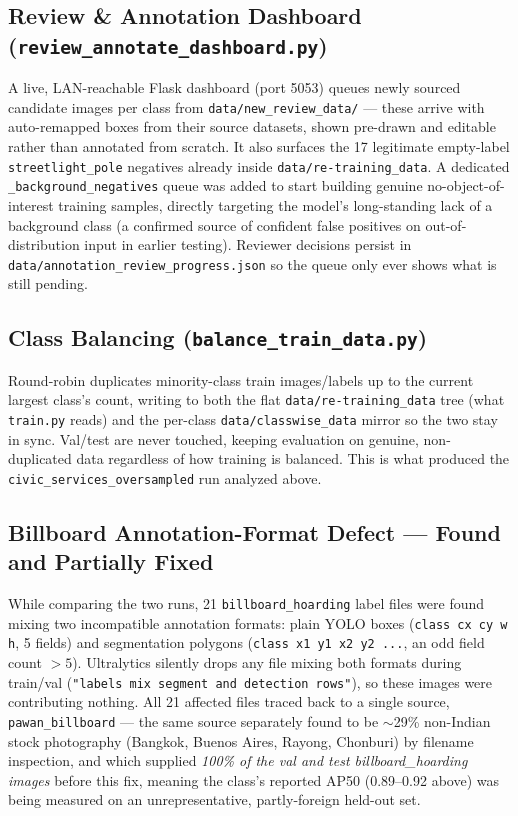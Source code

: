 \documentclass[11pt]{article}
\begin{document}
\subsection{Review \& Annotation Dashboard (\texttt{review\_annotate\_dashboard.py})}
A live, LAN-reachable Flask dashboard (port 5053) queues newly sourced candidate images
per class from \texttt{data/new\_review\_data/} — these arrive with auto-remapped boxes
from their source datasets, shown pre-drawn and editable rather than annotated from
scratch. It also surfaces the 17 legitimate empty-label \texttt{streetlight\_pole}
negatives already inside \texttt{data/re-training\_data}. A dedicated
\texttt{\_background\_negatives} queue was added to start building genuine
no-object-of-interest training samples, directly targeting the model's long-standing
lack of a background class (a confirmed source of confident false positives on
out-of-distribution input in earlier testing). Reviewer decisions persist in
\texttt{data/annotation\_review\_progress.json} so the queue only ever shows what is
still pending.

\subsection{Class Balancing (\texttt{balance\_train\_data.py})}
Round-robin duplicates minority-class train images/labels up to the current largest
class's count, writing to both the flat \texttt{data/re-training\_data} tree (what
\texttt{train.py} reads) and the per-class \texttt{data/classwise\_data} mirror so the
two stay in sync. Val/test are never touched, keeping evaluation on genuine, non-duplicated
data regardless of how training is balanced. This is what produced the
\texttt{civic\_services\_oversampled} run analyzed above.

\subsection{Billboard Annotation-Format Defect — Found and Partially Fixed}
While comparing the two runs, 21 \texttt{billboard\_hoarding} label files were found
mixing two incompatible annotation formats: plain YOLO boxes (\texttt{class cx cy w h},
5 fields) and segmentation polygons (\texttt{class x1 y1 x2 y2 ...}, an odd field count
$>5$). Ultralytics silently drops any file mixing both formats during train/val
(\texttt{"labels mix segment and detection rows"}), so these images were contributing
nothing. All 21 affected files traced back to a single source, \texttt{pawan\_billboard} —
the same source separately found to be $\sim$29\% non-Indian stock photography (Bangkok,
Buenos Aires, Rayong, Chonburi) by filename inspection, and which supplied
\emph{100\% of the val and test billboard\_hoarding images} before this fix, meaning the
class's reported AP50 (0.89--0.92 above) was being measured on an unrepresentative,
partly-foreign held-out set.
\end{document}
